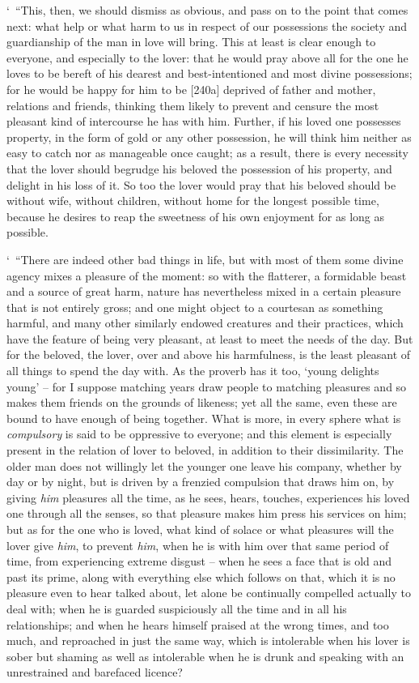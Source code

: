 ‘~“This, then, we should dismiss as obvious, and pass on to  the
point that comes next: what help or what harm to us in respect of our
possessions the society and guardianship of the man in love will bring.
This at least is clear enough to everyone, and especially to the lover:
that he would pray above all for the  one he loves to be bereft
of his dearest and best-intentioned and most divine possessions; for he
would be happy for him to be {[}240a{]} deprived of father and mother,
relations and friends, thinking them likely to prevent and censure the
most pleasant kind of intercourse he has with him. Further, if his loved
one possesses property, in the form of gold or any other possession, he
will think him neither as easy to catch nor as manageable once caught;
as a result, there is every necessity that the lover should 
begrudge his beloved the possession of his property, and delight in his
loss of it. So too the lover would pray that his beloved should be
without wife, without children, without home for the longest possible
time, because he desires to reap the sweetness of his own enjoyment for
as long as possible.

‘~“There are indeed other bad things in life, but with most of them
 some divine agency mixes a pleasure of the moment: so with the
flatterer, a formidable beast and a source of great harm, nature has
nevertheless mixed in a certain pleasure that is not entirely gross; and
one might object to a courtesan as something harmful, and many other
similarly endowed creatures  and their practices, which have the
feature of being very pleasant, at least to meet the needs of the day.
But for the beloved, the lover, over and above his harmfulness, is the
least  pleasant of all things to spend the day with. As the
proverb has it too, ‘young delights young' -- for I suppose matching
years draw people to matching pleasures and so makes them friends on the
grounds of likeness; yet all the same, even these are bound to have
enough of being together. What is more, in every sphere what is
{\em compulsory} is said to be oppressive to everyone;  and this
element is especially present in the relation of lover to beloved, in
addition to their dissimilarity. The older man does not willingly let
the younger one leave his company, whether by day or by night, but is
driven by a frenzied compulsion that  draws him on, by giving
{\em him} pleasures all the time, as he sees, hears, touches,
experiences his loved one through all the senses, so that pleasure makes
him press his services on him; but as for the one who is loved, what
kind of solace or what pleasures  will the lover give {\em him},
to prevent {\em him}, when he is with him over that same period of time,
from experiencing extreme disgust -- when he sees a face that is old and
past its prime, along with everything else which follows on that, which
it is no pleasure  even to hear talked about, let alone be
continually compelled actually to deal with; when he is guarded
suspiciously all the time and in all his relationships; and when he
hears himself praised at the wrong times, and too much, and reproached
in just the same way, which is intolerable when his lover is sober but
 shaming as well as intolerable when he is drunk and speaking
with an unrestrained and barefaced licence?

